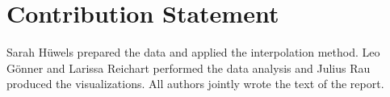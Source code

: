 \documentclass{article}
\begin{document}
\section*{Contribution Statement}

Sarah Hüwels prepared the data and applied the interpolation method. Leo Gönner and Larissa Reichart performed the data analysis and Julius Rau produced the visualizations. All authors jointly wrote the text of the report.



\end{document}
